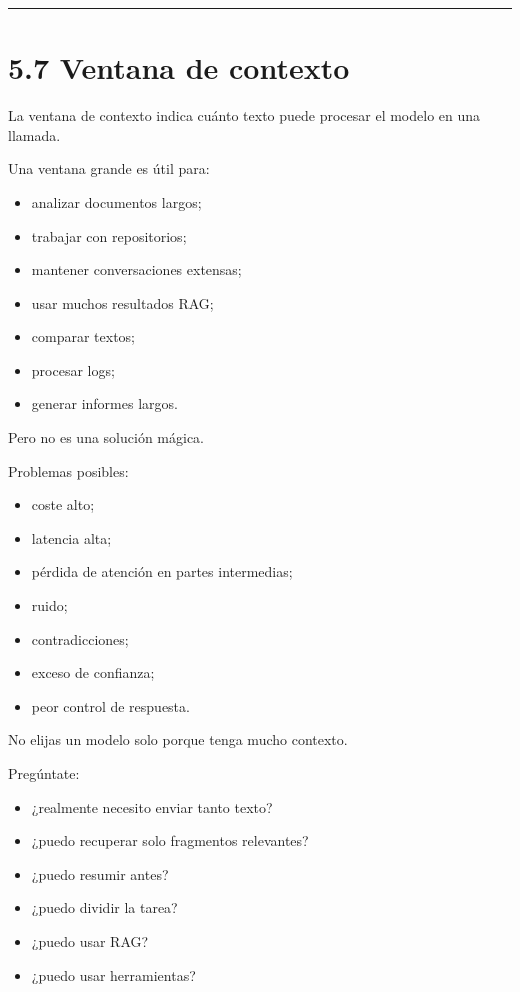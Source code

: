 \begin{center}\rule{0.5\linewidth}{0.5pt}\end{center}

\section{5.7 Ventana de contexto}\label{ventana-de-contexto-1}

La ventana de contexto indica cuánto texto puede procesar el modelo en
una llamada.

Una ventana grande es útil para:

\begin{itemize}
\tightlist
\item
  analizar documentos largos;
\item
  trabajar con repositorios;
\item
  mantener conversaciones extensas;
\item
  usar muchos resultados RAG;
\item
  comparar textos;
\item
  procesar logs;
\item
  generar informes largos.
\end{itemize}

Pero no es una solución mágica.

Problemas posibles:

\begin{itemize}
\tightlist
\item
  coste alto;
\item
  latencia alta;
\item
  pérdida de atención en partes intermedias;
\item
  ruido;
\item
  contradicciones;
\item
  exceso de confianza;
\item
  peor control de respuesta.
\end{itemize}

No elijas un modelo solo porque tenga mucho contexto.

Pregúntate:

\begin{itemize}
\tightlist
\item
  ¿realmente necesito enviar tanto texto?
\item
  ¿puedo recuperar solo fragmentos relevantes?
\item
  ¿puedo resumir antes?
\item
  ¿puedo dividir la tarea?
\item
  ¿puedo usar RAG?
\item
  ¿puedo usar herramientas?
\end{itemize}

